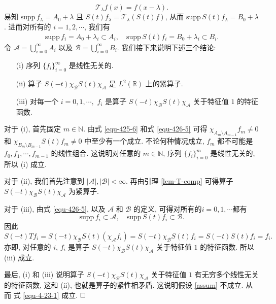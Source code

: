 \documentclass[master]{cugthesis}
\newcommand\N{\ensuremath{\mathbb{N}}}
\newcommand\R{\ensuremath{\mathbb{R}}}
\begin{document}
\begin{equation*}
    \mathcal{T}_{\lambda}f(x)=f(x-\lambda).
\end{equation*}
易知   $\mathrm{supp}\, f_\lambda=A_0+\lambda$ 且 $S(t)f_\lambda=\mathcal{T}_{\lambda}(S(t)f)$, 从而  $\mathrm{supp}\,S(t)f_\lambda= B_0+\lambda$. 进而对所有的 $i=1,2,\cdots$, 我们有
\begin{align}\label{equ-426-5}
\mathrm{supp }\,f_i=A_0+\lambda_i\subset A_i, \quad \mathrm{supp}\,S(t)f_i =B_0+\lambda_i\subset B_i.
\end{align}
令 $\mathcal {A}=\bigcup_{i=0}^{\infty}A_i$ 以及 $\mathcal {B}=\bigcup_{i=0}^{\infty}B_i$. 我们接下来说明下述三个结论:
\begin{itemize}
  \item [(i)] 序列 $\{ f_i\}_{i=0}^{\infty}$ 是线性无关的.
  \item [(ii)]  算子 $S(-t)\chi_\mathcal {B}S(t)\chi_\mathcal {A}$ 是 $L^2(\R)$ 上的紧算子.
  \item [(iii)]  对每一个 $i=0,1,\cdots,$ $f_i$ 是算子 $S(-t)\chi_\mathcal {B}S(t)\chi_\mathcal {A}$ 关于特征值 $1$ 的特征函数.
\end{itemize}

对于 (i), 首先固定 $m\in \mathbb{N}$. 由式 \eqref{equ-425-6} 和式 \eqref{equ-426-5} 可得 $\chi_{A_m\setminus A_{m-1}}f_m\neq 0$ 和 $\chi_{B_m\setminus B_{m-1}}S(t)f_m\neq 0$ 中至少有一个成立. 不论何种情况成立,  $f_m$ 都不可能是 $f_0,f_1,\cdots,f_{m-1}$ 的线性组合. 这说明对任意的 $m\in \N$, 序列 $\{f_i\}_{i=0}^{m}$ 是线性无关的, 所以 (i) 成立.

对于 (ii), 我们首先注意到 $|\mathcal {A}|,|\mathcal {B}|<\infty$. 再由引理 \ref{lem-T-comp} 可得算子 $S(-t)\chi_\mathcal {B}S(t)\chi_\mathcal {A}$ 为紧算子.

对于 (iii),  由式 \eqref{equ-426-5}, 以及 $\mathcal {A}$ 和 $\mathcal {B}$ 的定义, 可得对所有的$i=0,1,\cdots$都有
$$
\mathrm{supp }\, f_i\subset \mathcal {A}, \quad \mathrm{supp }\,  S(t)f_i\subset \mathcal {B}.
$$
因此
$$
S(-t)Tf_i=S(-t)\chi_{\mathcal {B}}S(t)(\chi_{\mathcal {A}}f_i)=S(-t)\chi_{\mathcal {B}}S(t)f_i=S(-t)S(t)f_i=f_i.
$$
亦即, 对任意的 $i$, $f_i$ 是算子 $S(-t)\chi_\mathcal {B}S(t)\chi_\mathcal {A}$ 关于特征值 $1$ 的特征函数. 所以 (iii) 成立.

最后, (i) 和 (iii) 说明算子 $S(-t)\chi_\mathcal {B}S(t)\chi_\mathcal {A}$  关于特征值 $1$ 有无穷多个线性无关的特征函数, 这和 (ii), 也就是算子的紧性相矛盾. 这说明假设  \eqref{assum} 不成立. 从而 式 \eqref{equ-4-23-1} 成立. $\hfill\Box$
\end{document}
